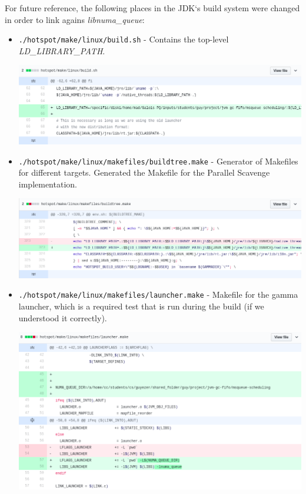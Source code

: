 \documentclass{article}
\begin{document}
 For future reference, the following places in the JDK`s build system were changed in order to link agains \textit{libnuma\_queue}:
 \begin{itemize}
   \item \texttt{./hotspot/make/linux/build.sh} - Contains the top-level \textit{LD\_LIBRARY\_PATH}.

     \includegraphics[width=\textwidth]{build.png}
   \item \texttt{./hotspot/make/linux/makefiles/buildtree.make} - Generator of Makefiles for different targets. Generated the Makefile for the Parallel Scavenge implementation.

     \includegraphics[width=\textwidth]{buildtree.png}
   \item \texttt{./hotspot/make/linux/makefiles/launcher.make} - Makefile for the gamma launcher, which is a required test that is run during the build (if we understood it correctly).

     \includegraphics[width=\textwidth]{launcher.png}
 \end{itemize}
\end{document}
